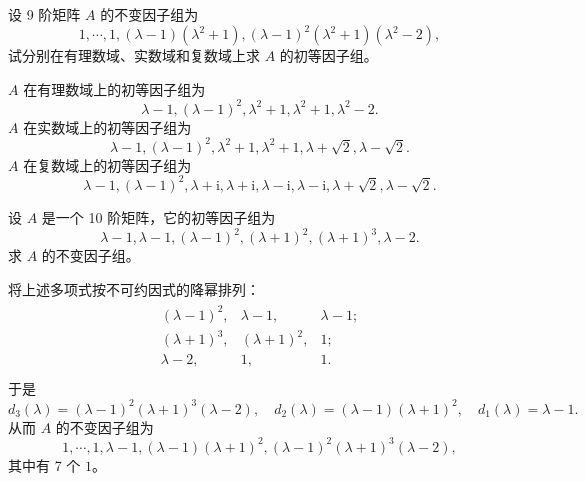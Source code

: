 \documentclass[../../main.tex]{subfiles}
\begin{document}
\begin{example}
设 9 阶矩阵 $A$ 的不变因子组为
\[
1,\cdots,1,(\lambda - 1)(\lambda^2 + 1),(\lambda - 1)^2(\lambda^2 + 1)(\lambda^2 - 2),
\]
试分别在有理数域、实数域和复数域上求 $A$ 的初等因子组。
\end{example}
\begin{solution}
$A$ 在有理数域上的初等因子组为
\[
\lambda - 1,(\lambda - 1)^2,\lambda^2 + 1,\lambda^2 + 1,\lambda^2 - 2.
\]
$A$ 在实数域上的初等因子组为
\[
\lambda - 1,(\lambda - 1)^2,\lambda^2 + 1,\lambda^2 + 1,\lambda + \sqrt{2},\lambda - \sqrt{2}.
\]
$A$ 在复数域上的初等因子组为
\[
\lambda - 1,(\lambda - 1)^2,\lambda + \mathrm{i},\lambda + \mathrm{i},\lambda - \mathrm{i},\lambda - \mathrm{i},\lambda + \sqrt{2},\lambda - \sqrt{2}.
\]

\end{solution}

\begin{example}
设 $A$ 是一个 10 阶矩阵，它的初等因子组为
\[
\lambda - 1,\lambda - 1,(\lambda - 1)^2,(\lambda + 1)^2,(\lambda + 1)^3,\lambda - 2.
\]
求 $A$ 的不变因子组。
\end{example}
\begin{solution}
将上述多项式按不可约因式的降幂排列：
\begin{align*}
\begin{matrix}
(\lambda -1)^2,&		\lambda -1,&		\lambda -1;\\
(\lambda +1)^3,&		(\lambda +1)^2,&		1;\\
\lambda -2,&		1,&		1.\\
\end{matrix}
\end{align*}
于是
\[
d_3(\lambda)=(\lambda - 1)^2(\lambda + 1)^3(\lambda - 2),\quad d_2(\lambda)=(\lambda - 1)(\lambda + 1)^2,\quad d_1(\lambda)=\lambda - 1.
\]
从而 $A$ 的不变因子组为
\[
1,\cdots,1,\lambda - 1,(\lambda - 1)(\lambda + 1)^2,(\lambda - 1)^2(\lambda + 1)^3(\lambda - 2),
\]
其中有 7 个 $1$。 

\end{solution}
\end{document}
